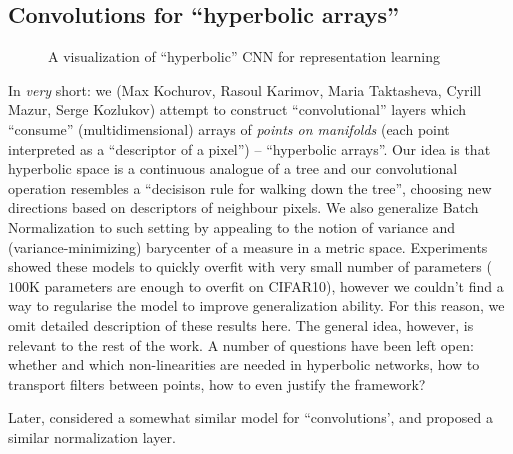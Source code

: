\subsection{Convolutions for ``hyperbolic arrays''} \label{sec:hconv}

\begin{figure}[ht]\center
{}
\caption{A visualization of ``hyperbolic'' CNN for representation learning}
\end{figure}

In \emph{very} short: we (Max Kochurov, Rasoul Karimov, Maria Taktasheva,
Cyrill Mazur, Serge Kozlukov) attempt to construct ``convolutional'' layers
which ``consume'' (multidimensional) arrays of \emph{points on manifolds} (each
point interpreted as a ``descriptor of a pixel'') -- ``hyperbolic arrays''. Our
idea is that hyperbolic space is a continuous analogue of a tree and our
convolutional operation resembles a ``decisison rule for walking down the
tree'', choosing new directions based on descriptors of neighbour pixels. We
also generalize Batch Normalization to such setting by appealing to the notion
of variance and (variance-minimizing) barycenter of a measure in a metric
space. Experiments showed these models to quickly overfit with very small number
of parameters (\( 100 \)K parameters are enough to overfit on CIFAR10),
however we couldn't find a way to regularise the model to improve generalization
ability. For this reason, we omit detailed description of these results here.
The general idea, however, is relevant to the rest of the work. A number
of questions have been left open: whether and which non-linearities are needed
in hyperbolic networks, how to transport filters between points, how to even
justify the framework?

Later, \citet{bouza2020mvc} considered a somewhat similar model for
``convolutions', and \citet{chakraborty2020manifoldnorm} proposed a similar
normalization layer.

